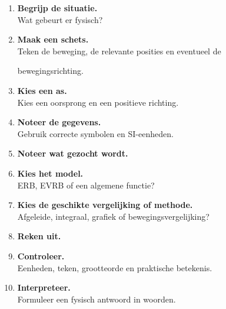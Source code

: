 \documentclass{ximera}
\begin{document}
\begin{eigenschap}

\begin{enumerate}

 \item \textbf{Begrijp de situatie.}\\

    Wat gebeurt er fysisch?

 \item \textbf{Maak een schets.}\\

    Teken de beweging, de relevante posities en eventueel de

    bewegingsrichting.

 \item \textbf{Kies een as.}\\

    Kies een oorsprong en een positieve richting.

 \item \textbf{Noteer de gegevens.}\\

    Gebruik correcte symbolen en SI-eenheden.

 \item \textbf{Noteer wat gezocht wordt.}

 \item \textbf{Kies het model.}\\

    ERB, EVRB of een algemene functie?

 \item \textbf{Kies de geschikte vergelijking of methode.}\\

    Afgeleide, integraal, grafiek of bewegingsvergelijking?

 \item \textbf{Reken uit.}

 \item \textbf{Controleer.}\\

    Eenheden, teken, grootteorde en praktische betekenis.

 \item \textbf{Interpreteer.}\\

    Formuleer een fysisch antwoord in woorden.

\end{enumerate}

\end{eigenschap}
\end{document}

